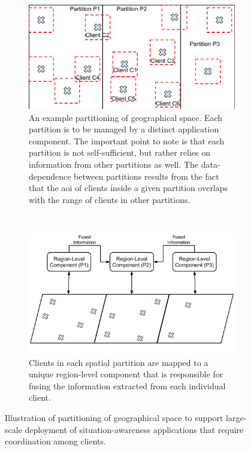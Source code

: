 \begin{figure}
\centering
\begin{subfigure}{0.45\textwidth}
  \centering
  \includegraphics[width=\linewidth]{figures/mechanisms/spatial_ctx_mgmt/aoi_range_partition.pdf}
  \caption{An example partitioning of geographical space. Each partition is to be managed by a distinct application component. The important point to note is that each partition is not self-sufficient, but rather relies on information from other partitions as well. The data-dependence between partitions results from the fact that the \gls{aoi} of clients inside a given partition overlaps with the range of clients in other partitions.}
  \label{fig:aoi_range_partition}
\end{subfigure}%
~~~
\begin{subfigure}{0.45\textwidth}
  \centering
  \includegraphics[width=\linewidth]{figures/mechanisms/spatial_ctx_mgmt/aoi_range_partition_mapping.pdf}
  \caption{Clients in each spatial partition are mapped to a unique region-level component that is responsible for fusing the information extracted from each individual client.}
  \label{fig:aoi_range_partition_mapping}
\end{subfigure}
\caption{Illustration of partitioning of geographical space to support large-scale deployment of situation-awareness applications that require coordination among clients.}
\label{fig:spatial_partitioning}
\end{figure}

